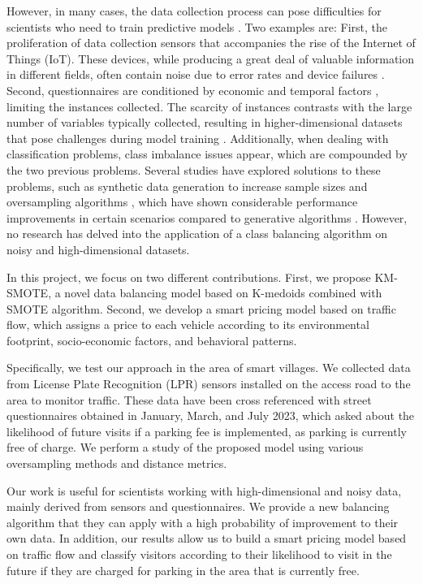 \documentclass[12pt]{book}
\begin{document}
However, in many cases, the data collection process can pose difficulties for scientists who need to train predictive models \citep{whang2023data}. Two examples are: First, the proliferation of data collection sensors that accompanies the rise of the Internet of Things (IoT). These devices, while producing a great deal of valuable information in different fields, often contain noise due to error rates and device failures \citep{mansouri2023iot}. Second, questionnaires are conditioned by economic and temporal factors \citep{gao2021forecast,kitsios2022user}, limiting the instances collected. The scarcity of instances contrasts with the large number of variables typically collected, resulting in higher-dimensional datasets that pose challenges during model training \citep{braga2020fundamentals}. Additionally, when dealing with classification problems, class imbalance issues appear, which are compounded by the two previous problems. Several studies have explored solutions to these problems, such as synthetic data generation to increase sample sizes \citep{kumar2023synthetic,wan2017variational} and oversampling algorithms \citep{elreedy2023theoretical,liang2020lr}, which have shown considerable performance improvements in certain scenarios compared to generative algorithms \citep{bao2023two,ahsan2023bsgan}. However, no research has delved into the application of a class balancing algorithm on noisy and high-dimensional datasets.

In this project, we focus on two different contributions. First, we propose KM-SMOTE, a novel data balancing model based on K-medoids combined with SMOTE algorithm. Second, we develop a smart pricing model based on traffic flow, which assigns a price to each vehicle according to its environmental footprint, socio-economic factors, and behavioral patterns.

Specifically, we test our approach in the area of smart villages. We collected data from License Plate Recognition (LPR) sensors installed on the access road to the area to monitor traffic. These data have been cross referenced with street questionnaires obtained in January, March, and July 2023, which asked about the likelihood of future visits if a parking fee is implemented, as parking is currently free of charge. We perform a study of the proposed model using various oversampling methods and distance metrics.

Our work is useful for scientists working with high-dimensional and noisy data, mainly derived from sensors and questionnaires. We provide a new balancing algorithm that they can apply with a high probability of improvement to their own data. In addition, our results allow us to build a smart pricing model based on traffic flow and classify visitors according to their likelihood to visit in the future if they are charged for parking in the area that is currently free.
\end{document}
